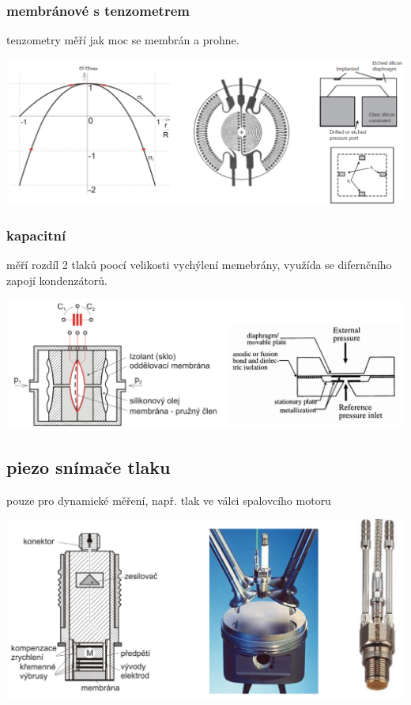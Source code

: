 \subsubsection*{membránové s tenzometrem}
tenzometry měří jak moc se membrán a prohne.

\includegraphics*[scale =0.2]{img/tlak_membrana.png}


\subsubsection*{kapacitní}
měří rozdíl 2 tlaků poocí velikosti vychýlení memebrány, využída se difernčního zapojí kondenzátorů.

\includegraphics*[scale = 0.5]{img/tlak_kapacita.png}

\subsection*{piezo snímače tlaku}
pouze pro dynamické měření, např. tlak ve válci spalovcího motoru

\includegraphics*[scale = 0.2]{img/tlak_piezo.png}

